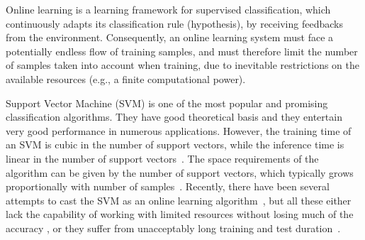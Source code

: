 Online learning is a learning framework for supervised classification, which continuously 
adapts its classification rule (hypothesis), by receiving feedbacks from the environment. 
Consequently, an online learning system must face a 
potentially endless flow of training samples, and must therefore limit
the number of samples taken into account when training, due to
inevitable restrictions on the available resources (e.g., a finite
computational power).

Support Vector Machine (SVM) is one of the most popular and promising classification algorithms. They have good theoretical basis and they entertain very good performance in numerous applications. However, the training time of an SVM is cubic in the number of support vectors, while the inference time is linear in the number of support vectors~\cite{KeerthiCDC06}. The space requirements of the algorithm can be given by the number of support vectors, which typically grows proportionally with number of samples~\cite{Steinwart03}. 
Recently, there have been several attempts to cast the SVM as an online learning algorithm~\cite{},
but all these either lack the
capability of working with limited resources without losing much
of the accuracy \cite{KivinenSW04}, or they suffer from unacceptably long
training and test duration~\cite{}. 





